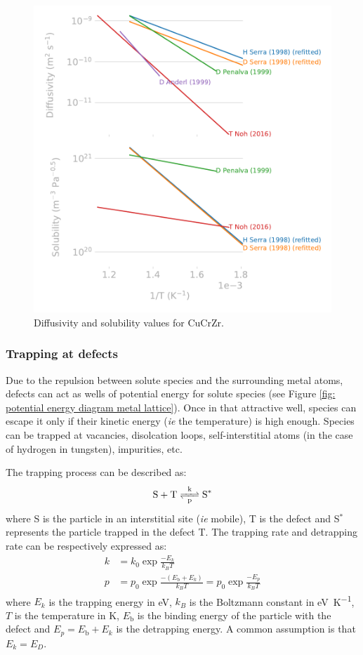 \begin{figure}
    \centering
    \includegraphics[width=0.75\linewidth]{Figures/Chapter1/cucrzr_properties_review.pdf}
    \caption{Diffusivity and solubility values for CuCrZr.}
\end{figure}

\subsubsection{Trapping at defects}

Due to the repulsion between solute species and the surrounding metal atoms, defects can act as wells of potential energy for solute species (see Figure \ref{fig: potential energy diagram metal lattice}).
Once in that attractive well, species can escape it only if their kinetic energy (\textit{ie} the temperature) is high enough.
Species can be trapped at vacancies, disolcation loops, self-interstitial atoms (in the case of hydrogen in tungsten), impurities, etc.

The trapping process can be described as:
\begin{equation}
    \ce{S + T <=>[k][p] S^*}
\end{equation}
where S is the particle in an interstitial site (\textit{ie} mobile), T is the defect and S$^*$ represents the particle trapped in the defect T.
The trapping rate and detrapping rate can be respectively expressed as:
\begin{align}
    k &= k_0 \exp{\frac{-E_k}{k_B T}} \\
    p &= p_0 \exp{\frac{-(E_\mathrm{b} + E_k)}{k_B T}} = p_0 \exp{\frac{-E_p}{k_B T}}
\end{align}
where $E_k$ is the trapping energy in \si{eV}, $k_B$ is the Boltzmann constant in \si{eV.K^{-1}}, $T$ is the temperature in \si{K}, $E_\mathrm{b}$ is the binding energy of the particle with the defect and $E_p = E_\mathrm{b} + E_k$ is the detrapping energy.
A common assumption is that $E_k = E_D$.

